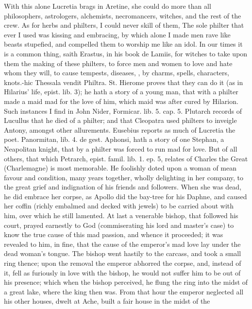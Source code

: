 {With this alone Lucretia brags in Aretine, she could do more than
all philosophers, astrologers, alchemists, necromancers, witches, and
the rest of the crew. As for herbs and philters, I could never skill of
them, The sole philter that ever I used was kissing and embracing, by
which alone I made men rave like beasts stupefied, and compelled them
to worship me like an idol. In our times it is a common thing, saith
Erastus, in his book de Lamiis, for witches to take upon them the
making of these philters, to force men and women to love and hate
whom they will, to cause tempests, diseases, \etc{}, by charms, spells,
characters, knots.-hic Thessala vendit Philtra. St. Hierome
proves that they can do it (as in Hilarius' life, epist. lib. 3); he
hath a story of a young man, that with a philter made a maid mad for
the love of him, which maid was after cured by Hilarion. Such instances
I find in John Nider, Formicar. lib. 5. cap. 5. Plutarch records of
Lucullus that he died of a philter; and that Cleopatra used philters to
inveigle Antony, amongst other allurements. Eusebius reports as much of
Lucretia the poet. Panormitan, lib. 4. de gest. Aphonsi, hath a story
of one Stephan, a Neapolitan knight, that by a philter was forced to
run mad for love. But of all others, that which Petrarch, epist.
famil. lib. 1. ep. 5, relates of Charles the Great (Charlemagne) is
most memorable. He foolishly doted upon a woman of mean favour and
condition, many years together, wholly delighting in her company, to
the great grief and indignation of his friends and followers. When she
was dead, he did embrace her corpse, as Apollo did the bay-tree for his
Daphne, and caused her coffin (richly embalmed and decked with jewels)
to be carried about with him, over which he still lamented. At last a
venerable bishop, that followed his court, prayed earnestly to God
(commiserating his lord and master's case) to know the true cause of
this mad passion, and whence it proceeded; it was revealed to him, in
fine, that the cause of the emperor's mad love lay under the dead
woman's tongue. The bishop went hastily to the carcass, and took a
small ring thence; upon the removal the emperor abhorred the corpse,
and, instead of it, fell as furiously in love with the bishop, he
would not suffer him to be out of his presence; which when the bishop
perceived, he flung the ring into the midst of a great lake, where the
king then was. From that hour the emperor neglected all his other
houses, dwelt at Ache, built a fair house in the midst of the
}
